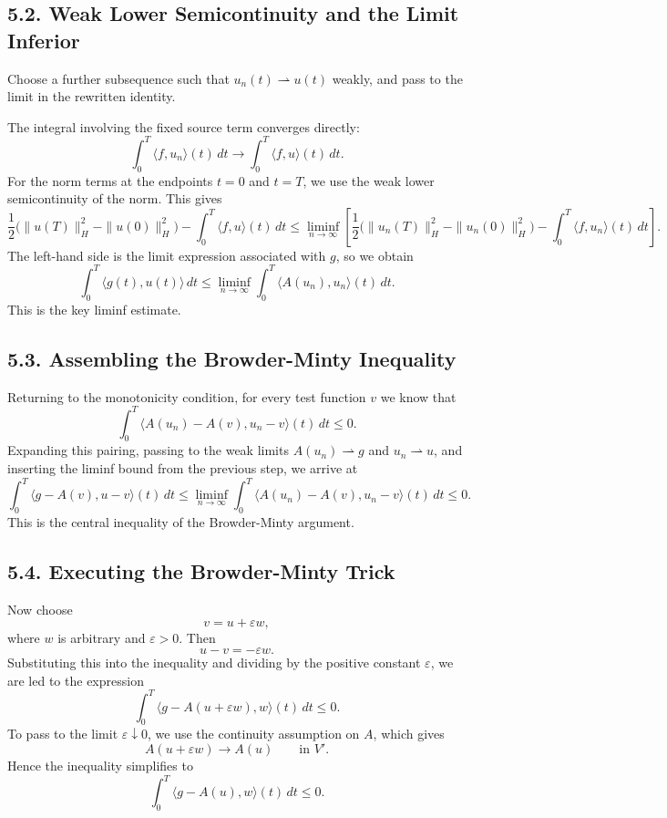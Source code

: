 \documentclass[11pt]{article}
\theoremstyle{definition}
\theoremstyle{remark}
\begin{document}
\subsection*{5.2. Weak Lower Semicontinuity and the Limit Inferior}
Choose a further subsequence such that \(u_n(t)\rightharpoonup u(t)\) weakly, and pass to the limit in the rewritten identity.

The integral involving the fixed source term converges directly:
\[
\int_0^T \langle f,u_n\rangle(t)\,dt
\to
\int_0^T \langle f,u\rangle(t)\,dt.
\]
For the norm terms at the endpoints \(t=0\) and \(t=T\), we use the weak lower semicontinuity of the norm. This gives
\[
\frac12\bigl(\|u(T)\|_H^2-\|u(0)\|_H^2\bigr)
-\int_0^T \langle f,u\rangle(t)\,dt
\le
\liminf_{n\to\infty}
\left[
\frac12\bigl(\|u_n(T)\|_H^2-\|u_n(0)\|_H^2\bigr)
-\int_0^T \langle f,u_n\rangle(t)\,dt
\right].
\]
The left-hand side is the limit expression associated with \(g\), so we obtain
\[
\int_0^T \langle g(t),u(t)\rangle\,dt
\le
\liminf_{n\to\infty}
\int_0^T \langle A(u_n),u_n\rangle(t)\,dt.
\]
This is the key liminf estimate.

\subsection*{5.3. Assembling the Browder-Minty Inequality}
Returning to the monotonicity condition, for every test function \(v\) we know that
\[
\int_0^T \langle A(u_n)-A(v),u_n-v\rangle(t)\,dt\le 0.
\]
Expanding this pairing, passing to the weak limits \(A(u_n)\rightharpoonup g\) and \(u_n\rightharpoonup u\), and inserting the liminf bound from the previous step, we arrive at
\[
\int_0^T \langle g-A(v),u-v\rangle(t)\,dt
\le
\liminf_{n\to\infty}
\int_0^T \langle A(u_n)-A(v),u_n-v\rangle(t)\,dt
\le 0.
\]
This is the central inequality of the Browder-Minty argument.

\subsection*{5.4. Executing the Browder-Minty Trick}
Now choose
\[
v=u+\varepsilon w,
\]
where \(w\) is arbitrary and \(\varepsilon>0\). Then
\[
u-v=-\varepsilon w.
\]
Substituting this into the inequality and dividing by the positive constant \(\varepsilon\), we are led to the expression
\[
\int_0^T \langle g-A(u+\varepsilon w),w\rangle(t)\,dt\le 0.
\]
To pass to the limit \(\varepsilon\downarrow 0\), we use the continuity assumption on \(A\), which gives
\[
A(u+\varepsilon w)\to A(u)
\qquad
\text{in } V'.
\]
Hence the inequality simplifies to
\[
\int_0^T \langle g-A(u),w\rangle(t)\,dt\le 0.
\]
\end{document}
